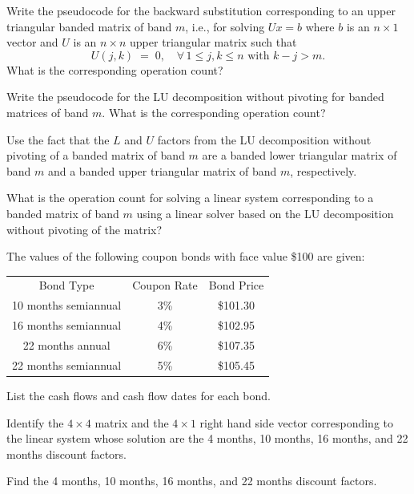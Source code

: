\begin{exercises}
\item Write the pseudocode for the backward substitution corresponding to an upper
triangular banded matrix of band $m$, i.e., for solving $Ux=b$ where $b$ is an
$n\times 1$ vector and $U$ is an $n\times n$ upper triangular matrix such that
\[
U(j,k) \;=\; 0, \quad \forall\, 1\le j,k\le n \text{ with } k-j>m.
\]
What is the corresponding operation count?

\item Write the pseudocode for the LU decomposition without pivoting for banded
matrices of band $m$. What is the corresponding operation count?

Use the fact that the $L$ and $U$ factors from the LU decomposition without pivoting
of a banded matrix of band $m$ are a banded lower triangular matrix of band $m$ and
a banded upper triangular matrix of band $m$, respectively.

\item What is the operation count for solving a linear system corresponding to a
banded matrix of band $m$ using a linear solver based on the LU decomposition
without pivoting of the matrix?

\item The values of the following coupon bonds with face value \$100 are given:

\begin{center}
\begin{tabular}{ccc}
Bond Type & Coupon Rate & Bond Price \\[0.4em]
10 months semiannual & 3\% & \$101.30 \\
16 months semiannual & 4\% & \$102.95 \\
22 months annual & 6\% & \$107.35 \\
22 months semiannual & 5\% & \$105.45 \\
\end{tabular}
\end{center}

\begin{subparts}
\item List the cash flows and cash flow dates for each bond.
\item Identify the $4\times 4$ matrix and the $4\times 1$ right hand side vector
corresponding to the linear system whose solution are the 4 months, 10 months, 16
months, and 22 months discount factors.
\item Find the 4 months, 10 months, 16 months, and 22 months discount factors.
\end{subparts}


\end{exercises}
